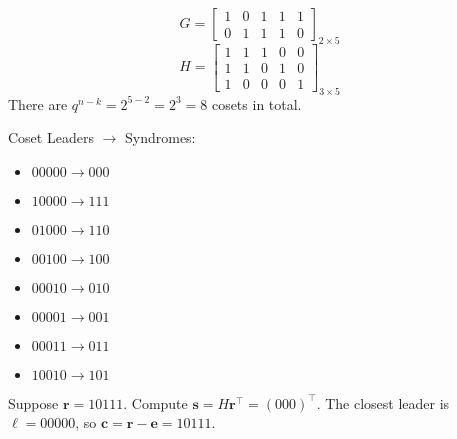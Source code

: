 \begin{exbox}
    \begin{example}
        \[ G=\begin{bmatrix}
            1 & 0 & 1 & 1 & 1\\
            0 & 1 & 1 & 1 & 0
        \end{bmatrix}_{2\times 5} \]
        \[ H=\begin{bmatrix}
            1 & 1 & 1 & 0 & 0\\
            1 & 1 & 0 & 1 & 0\\
            1 & 0 & 0 & 0 & 1
        \end{bmatrix}_{3\times 5} \]
        There are $ q^{n-k}=2^{5-2}=2^3=8 $ cosets in total.

        Coset Leaders $ \rightarrow $ Syndromes:
        \begin{itemize}
            \item $ 00000 \rightarrow 000 $
            \item $ 10000 \rightarrow 111 $
            \item $ 01000 \rightarrow 110 $
            \item $ 00100 \rightarrow 100 $
            \item $ 00010 \rightarrow 010 $
            \item $ 00001 \rightarrow 001 $
            \item $ 00011 \rightarrow 011 $
            \item $ 10010 \rightarrow 101 $
        \end{itemize}
        Suppose $ \bm{r}=10111 $. Compute $ \bm{s}=H\bm{r}^\top=(000)^\top $.
        The closest leader is $ \bm{\ell}=00000 $, so $ \bm{c}=\bm{r}-\bm{e}=
        10111 $.
    \end{example}
\end{exbox}
